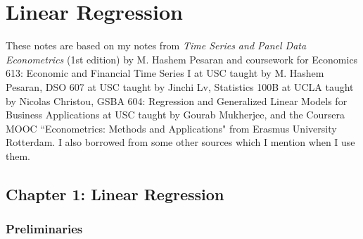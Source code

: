%
%
%
%
%
%
%
%
%
%
%
%
%
%

\chapter{Linear Regression}

These notes are based on my notes from \textit{Time Series and Panel Data Econometrics} (1st edition) by M. Hashem Pesaran \citep{pesaran-2015-text} and coursework for Economics 613: Economic and Financial Time Series I at USC taught by M. Hashem Pesaran, DSO 607 at USC taught by Jinchi Lv, Statistics 100B at UCLA taught by Nicolas Christou, GSBA 604: Regression and Generalized Linear Models for Business Applications at USC taught by Gourab Mukherjee, and the Coursera MOOC ``Econometrics: Methods and Applications" from Erasmus University Rotterdam. I also borrowed from some other sources which I mention when I use them.



\section{Chapter 1: Linear Regression}

\subsection{Preliminaries}

